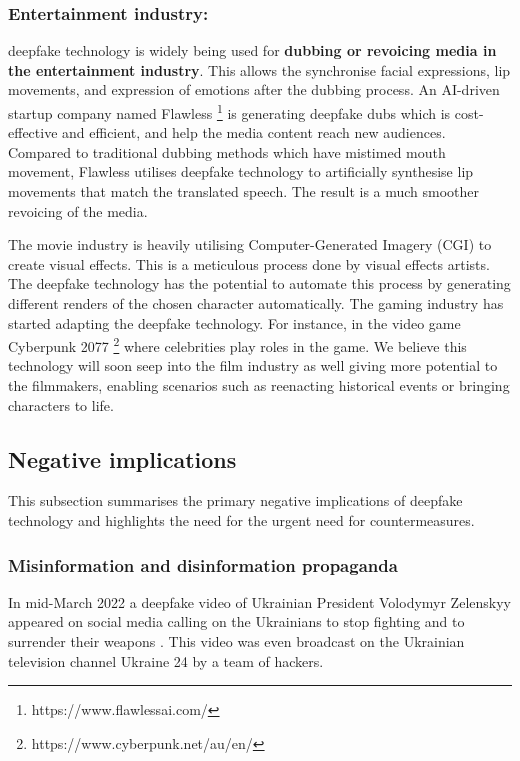\subsubsection{ Entertainment industry: }

deepfake technology is widely being used for \textbf{dubbing or revoicing media in the entertainment industry}. This allows the synchronise facial expressions, lip movements, and expression of emotions after the dubbing process. An AI-driven startup company named Flawless \footnote{https://www.flawlessai.com/} is generating deepfake dubs which is cost-effective and efficient, and help the media content reach new audiences. Compared to traditional dubbing methods which have mistimed mouth movement, Flawless utilises deepfake technology to artificially synthesise lip movements that match the translated speech. The result is a much smoother revoicing of the media. 

The movie industry is heavily utilising Computer-Generated Imagery (CGI) to create visual effects. This is a meticulous process done by visual effects artists. The deepfake technology has the potential to automate this process by generating different renders of the chosen character automatically. The gaming industry has started adapting the deepfake technology. For instance, in the video game Cyberpunk 2077 \footnote{https://www.cyberpunk.net/au/en/} where celebrities play roles in the game. We believe this technology will soon seep into the film industry as well giving more potential to the filmmakers, enabling scenarios such as reenacting historical events or bringing characters to life.  

\hspace{2mm}

\subsection{Negative implications}
This subsection summarises the primary negative implications of deepfake technology and highlights the need for the urgent need for countermeasures. 

\subsubsection{Misinformation and disinformation propaganda}

In mid-March 2022 a deepfake video of Ukrainian President Volodymyr Zelenskyy appeared on social media calling on the Ukrainians to stop fighting and to surrender their weapons \cite{deepfakenortheastern}. This video was even broadcast on the Ukrainian television channel Ukraine 24 by a team of hackers. 

